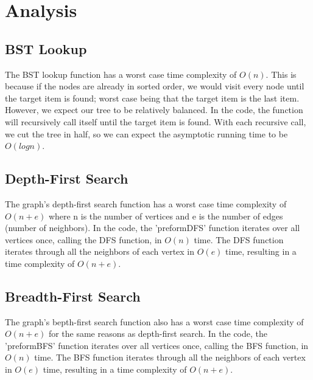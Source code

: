 \documentclass[letterpaper, 10pt,DIV=13]{scrartcl}
\numberwithin{equation}{section} %
\numberwithin{figure}{section} %
\numberwithin{table}{section} %
\begin{document}

\pagebreak


\section{Analysis}

\subsection{BST Lookup}
The BST lookup function has a worst case time complexity of $O(n)$. This is because if the nodes are already in sorted order, we would visit every node until the target item is found; worst case being that the target item is the last item. However, we expect our tree to be relatively balanced. In the code, the function will recursively call itself until the target item is found. With each recursive call, we cut the tree in half, so we can expect the asymptotic running time to be $O(logn)$.

\subsection{Depth-First Search}
The graph's depth-first search function has a worst case time complexity of $O(n + e)$ where n is the number of vertices and e is the number of edges (number of neighbors). In the code, the 'preformDFS' function iterates over all vertices once, calling the DFS function, in $O(n)$ time. The DFS function iterates through all the neighbors of each vertex in $O(e)$ time, resulting in a time complexity of $O(n + e)$.

\subsection{Breadth-First Search}
The graph's bepth-first search function also has a worst case time complexity of $O(n + e)$ for the same reasons as depth-first search. In the code, the 'preformBFS' function iterates over all vertices once, calling the BFS function, in $O(n)$ time. The BFS function iterates through all the neighbors of each vertex in $O(e)$ time, resulting in a time complexity of $O(n + e)$.


\pagebreak
\end{document}
